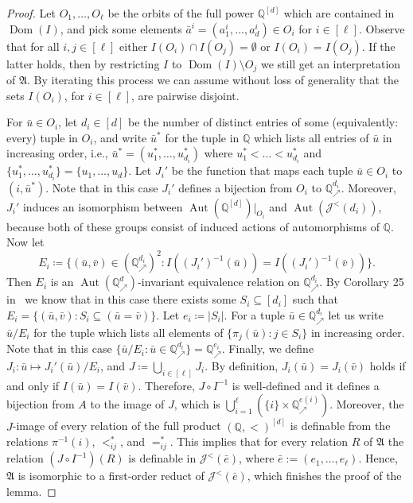 \documentclass{amsart}
\theoremstyle{definition}
\theoremstyle{remark}
\numberwithin{equation}{section}
\newcommand{\aut}{\operatorname{Aut}}
\newcommand{\dom}{\operatorname{Dom}}
\newcommand\johnord[1]{\mathcal{J}^{<}(#1)}
\newcommand{\fa}{\mathfrak{A}}
\newcommand{\fb}{\mathfrak{B}}
\newcommand\qup[1]{\mathbb{Q}_\nearrow^{#1}}
\begin{document}
\begin{proof}
	Let $O_1,\dots,O_{\ell}$ be the orbits of the full power $\mathbb{Q}^{[d]}$ which are contained in $\dom(I)$, and pick some elements $\bar{a}^i=(a_1^i,\dots,a_d^i)\in {O_i}$ for $i \in [\ell]$. Observe that for all $i,j\in [\ell]$ either $I(O_i)\cap I(O_j) =  \emptyset$ or $I(O_i)=I(O_j)$. If the latter holds, then by restricting $I$ to $\dom(I)\setminus O_j$ we still get an interpretation of $\fa$. By iterating this process we can assume without loss of generality that the sets $I(O_i)$, for $i\in [\ell]$, are pairwise disjoint.

    For $\bar{u} \in O_i$, let $d_i \in [d]$ be the number of distinct entries of some (equivalently: every) tuple in $O_i$, and write $\bar{u}^*$ for the tuple in $\mathbb{Q}$ which lists all entries of $\bar{u}$ in increasing order, i.e., $\bar{u}^*=(u^*_1,\dots,u_{d_i}^*)$ where 
    $u_1^*<\dots<u_{d_i}^*$ and $\{u_1^*,\dots,u_{d_i}^*\}=\{u_1,\dots,u_d\}$.
	Let $J_i'$ be the function that maps each tuple $\bar{u}\in O_i$ to $(i,\bar{u}^*)$. Note that in this case $J_i'$ defines a bijection from $O_i$ to $\qup{d_i}$. Moreover, $J_i'$ induces an isomorphism between $\aut(\mathbb{Q}^{[d]})|_{O_i}$ and $\aut(\johnord{d_i})$, because both of these groups consist of induced actions of automorphisms of $\mathbb{Q}$. Now let
\[
E_i\coloneqq \{(\bar{u},\bar{v})\in (\qup{d_i})^2: I((J_i')^{-1}(\bar{u}))=I((J_i')^{-1}(\bar{v}))\}.
\]
	Then $E_i$ is an $\aut(\qup{d})$-invariant equivalence relation on $\qup{d_i}$. By Corollary 25 in~\cite{bodirsky2025structures} we know that in this case there exists some $S_i\subseteq [{d_i}]$ such that $E_i=\{(\bar{u},\bar{v}): S_i \subseteq (\bar{u}=\bar{v})\}$. Let $e_i \coloneqq {|S_i|}$. For a tuple $\bar{u}\in \qup{d_i}$ let us write $\bar{u}/E_i$ for the tuple which lists all elements of $\{\pi_j(\bar{u}): j{\in} S_i\}$ in increasing order. Note that in this case $\{\bar{u}/E_i: \bar{u}\in \qup{d_i}\}=\qup{e_i}$. Finally, we define $J_i \colon \bar{u}\mapsto J_i'(\bar{u})/E_i$, and $J\coloneqq\bigcup_{i\in [\ell]} J_i$. By definition,  $J_i(\bar{u})=J_i(\bar{v})$ holds if and only if $I(\bar{u})=I(\bar{v})$. Therefore, $J\circ I^{-1}$ is well-defined and it defines a bijection from $A$ to the image of $J$, which is $\bigcup_{i=1}^{\ell}({\{i\}\times \qup{e(i)}})$. Moreover, the $J$-image of every relation of the full product $(\mathbb{Q},<)^{[d]}$ is definable from the relations $\pi^{-1}(i)$, $<_{ij}^*$, and $=_{ij}^*$. This implies that for every relation $R$ of $\fa$ the relation $(J\circ I^{-1})(R)$ is definable in 
    $\johnord{\bar{{e}}}$, where ${\bar e} := ({e_1,\dots,e_{\ell}})$. 
    Hence, $\fa$ is isomorphic to a first-order reduct of $\johnord{{\bar{e}}}$, which finishes the proof of the lemma.
\end{proof}
\end{document}
